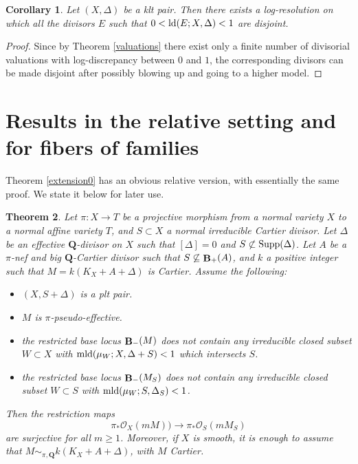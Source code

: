 \documentclass[11pt]{amsart}
\theoremstyle{plain}
\newtheorem{theorem}{Theorem}[section]
\newtheorem{corollary}[theorem]{Corollary}
\theoremstyle{definition}
\newcommand{\QQ}{\mathbf{Q}}
\newcommand{\OO}{\mathcal  {O}}
\DeclareMathOperator{\BB}{{\bf B}}
\begin{document}
\begin{corollary}\label{separation}
Let $(X, \Delta)$ be a klt pair. Then there exists a log-resolution on which all the divisors 
$E$ such that $0 < {\rm ld} (E; X, \Delta) < 1$ are disjoint.
\end{corollary}
\begin{proof}
Since by Theorem \ref{valuations} there exist only a finite number of divisorial valuations with log-discrepancy between $0$
and $1$, the corresponding divisors can be made disjoint after possibly blowing up and going to a higher model.
\end{proof}






\section{Results in the relative setting and for fibers of families}


Theorem \ref{extension0} has an obvious relative version, with essentially the same proof. We state it below for later use.

\begin{theorem}\label{relative}
Let $\pi : X \rightarrow T$ be a projective morphism from a normal variety $X$ to a normal affine variety $T$, and $S \subset X$ a normal irreducible Cartier divisor. Let $\Delta$ be an effective $\QQ$-divisor on $X$ such that $[\Delta] = 0$ and $S \not \subset {\rm Supp}(\Delta)$. Let $A$ be a $\pi$-nef and big $\QQ$-Cartier divisor such that $S \not\subseteq \BB_{+} (A)$, and $k$ a positive integer such that $M =  k(K_X + A + \Delta)$ is Cartier. Assume the following:
\begin{itemize}
\item $(X, S + \Delta)$ is a plt pair. 
\item $M$ is $\pi$-pseudo-effective.
\item the restricted base locus $\BB_{-} (M)$ does not contain any irreducible closed subset $W\subset X$ 
with ${\rm mld}(\mu_W ; X, \Delta + S) < 1$ which intersects $S$. 
\item the restricted base locus $\BB_{-} (M_S)$ does not contain any irreducible closed subset 
$W\subset S$ 
with ${\rm mld}(\mu_W ; S, \Delta_S) < 1$.
\end{itemize}
Then the restriction maps 
$$\pi_* \OO_X (mM)) \longrightarrow \pi_*\OO_S (mM_S)$$
are surjective for all $m \ge 1$.  Moreover, if $X$ is smooth, it is enough to assume that $M\sim_{\pi,\QQ} k(K_X + A + \Delta)$, with $M$ Cartier.
\end{theorem}
\end{document}
